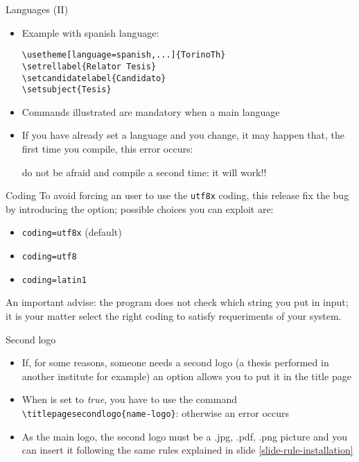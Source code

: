\begin{frame}[t,fragile]{Languages (II)}
\begin{itemize}
\item Example with spanish language:
\begin{verbatim}
\usetheme[language=spanish,...]{TorinoTh}
\setrellabel{Relator Tesis}
\setcandidatelabel{Candidato}
\setsubject{Tesis}
\end{verbatim}
\item Commands illustrated are mandatory when  a main language
\item If you have already set a language and you change, it may happen that, the first time you compile, this error occurs: \begin{flushleft}
\end{flushleft}
do not be afraid and compile a second time: it will work!!
\end{itemize}
\end{frame}

\begin{frame}[t,fragile]{Coding}
To avoid forcing an user to use the \verb!utf8x! coding, this release fix the bug by introducing the  option; possible choices you can exploit are:
\begin{itemize}
\item \verb!coding=utf8x! (default)
\item \verb!coding=utf8! 
\item \verb!coding=latin1! 
\end{itemize}
An important advise: the program does not check which string you put in input; it is your matter select the right coding to satisfy requeriments of your system.
\end{frame}

\begin{frame}[t,fragile]{Second logo}
\begin{itemize}
\item If, for some reasons, someone needs a second logo (a thesis performed in another institute for example) an option allows you to put it in the title page
\item When  is set to \emph{true}, you have to use the command \verb!\titlepagesecondlogo{name-logo}!: otherwise an error occurs
\item As the main logo, the second logo must be a .jpg, .pdf, .png picture and you can insert it following the same rules explained in slide \ref{slide-rule-installation}
\end{itemize}
\end{frame}

